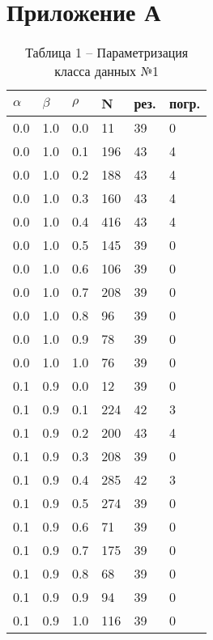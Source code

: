 \chapter*{Приложение А}
\label{sec:fig1}

\renewcommand\thetable{} 

\begin{table}[!htb]
	\begin{minipage}{.45\linewidth}
		\caption*{Таблица 1 -- Параметризация класса данных №1}
		\centering
		\begin{tabular}{||p{}p{}p{}p{}p{}p{}||}
			\hline
			$\alpha$ & $\beta$ & $\rho$ & N & рез. & погр. \\ \hline\hline
			0.0 & 1.0 & 0.0 & 11 & 39 & 0 \\ 
			0.0 & 1.0 & 0.1 & 196 & 43 & 4 \\ 
			0.0 & 1.0 & 0.2 & 188 & 43 & 4 \\ 
			0.0 & 1.0 & 0.3 & 160 & 43 & 4 \\ 
			0.0 & 1.0 & 0.4 & 416 & 43 & 4 \\ 
			0.0 & 1.0 & 0.5 & 145 & 39 & 0 \\ 
			0.0 & 1.0 & 0.6 & 106 & 39 & 0 \\ 
			0.0 & 1.0 & 0.7 & 208 & 39 & 0 \\ 
			0.0 & 1.0 & 0.8 & 96 & 39 & 0 \\ 
			0.0 & 1.0 & 0.9 & 78 & 39 & 0 \\ 
			0.0 & 1.0 & 1.0 & 76 & 39 & 0  \\ \hline
			0.1 & 0.9 & 0.0 & 12 & 39 & 0 \\ 
			0.1 & 0.9 & 0.1 & 224 & 42 & 3 \\ 
			0.1 & 0.9 & 0.2 & 200 & 43 & 4 \\ 
			0.1 & 0.9 & 0.3 & 208 & 39 & 0 \\ 
			0.1 & 0.9 & 0.4 & 285 & 42 & 3 \\ 
			0.1 & 0.9 & 0.5 & 274 & 39 & 0 \\ 
			0.1 & 0.9 & 0.6 & 71 & 39 & 0 \\ 
			0.1 & 0.9 & 0.7 & 175 & 39 & 0 \\ 
			0.1 & 0.9 & 0.8 & 68 & 39 & 0 \\ 
			0.1 & 0.9 & 0.9 & 94 & 39 & 0 \\ 
			0.1 & 0.9 & 1.0 & 116 & 39 & 0  \\ \hline

\end{tabular}
\end{minipage}
\end{table}
